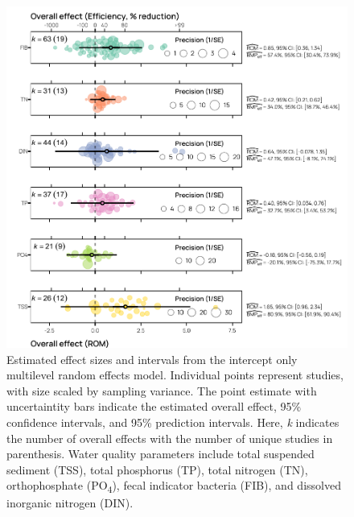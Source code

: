 \documentclass[utf8]{FrontiersinHarvard}
\begin{document}
\begin{figure}[p]
\includegraphics[width=1\linewidth,]{frontiers_submission_revision_01_files/figure-latex/fig5} \caption{Estimated effect sizes and intervals from the intercept only multilevel random effects model. Individual points represent studies, with size scaled by sampling variance. The point estimate with uncertaintity bars indicate the estimated overall effect, 95\% confidence intervals, and 95\% prediction intervals. Here, \textit{k} indicates the number of overall effects with the number of unique studies in parenthesis. Water quality parameters include total suspended sediment (TSS), total phosphorus (TP), total nitrogen (TN), orthophosphate (PO\textsubscript{4}), fecal indicator bacteria (FIB), and dissolved inorganic nitrogen (DIN).}\label{fig:fig5}
\end{figure}
\end{document}
